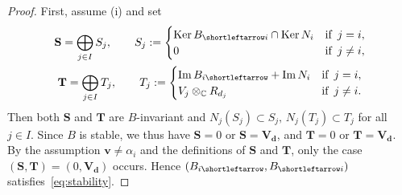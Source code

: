 \documentclass[pdftex]{sigma}
\newcommand{\slar}{\shortleftarrow}
\numberwithin{equation}{section}
\theoremstyle{definition}
\newcommand{\C}{\mathbb{C}} %
\newcommand{\Ker}{\operatorname{Ker}}
\newcommand{\range}{\operatorname{Im}}
\newcommand{\bV}{\mathbf{V}}
\newcommand{\bv}{\mathbf{v}}
\newcommand{\bS}{\mathbf{S}}
\newcommand{\bT}{\mathbf{T}}
\newcommand{\ved}{\mathbf{d}}
\newcommand{\hquad}{\hspace{.5em}}
\begin{document}
\begin{proof}
First, assume (i) and set
\begin{gather*}
\bS =\bigoplus_{j\in I} S_j, \qquad
S_j :=
\begin{cases}
\Ker B_{\slar i} \cap \Ker N_i & \text{if}\hquad j=i, \\
0 & \text{if}\hquad j \neq i,
\end{cases} \\
\bT =\bigoplus_{j\in I} T_j, \qquad
T_j :=
\begin{cases}
\range B_{i \slar} + \range N_i & \text{if}\hquad j=i, \\
V_j \otimes_\C R_{d_j} & \text{if}\hquad j \neq i.
\end{cases}
\end{gather*}
Then both $\bS$ and $\bT$ are $B$-invariant and
$N_j(S_j) \subset S_j,\, N_j(T_j) \subset T_j$ for all $j \in I$.
Since $B$ is stable,
we thus have $\bS =0$ or $\bS=\bV_\ved$,
and $\bT=0$ or $\bT=\bV_\ved$.
By the assumption $\bv \neq \alpha_i$ and the def\/initions of $\bS$ and $\bT$,
only the case $(\bS,\bT)=(0,\bV_\ved)$ occurs.
Hence $(B_{i \slar},B_{\slar i})$ satisf\/ies~\eqref{eq:stability}.


\end{proof}
\end{document}
